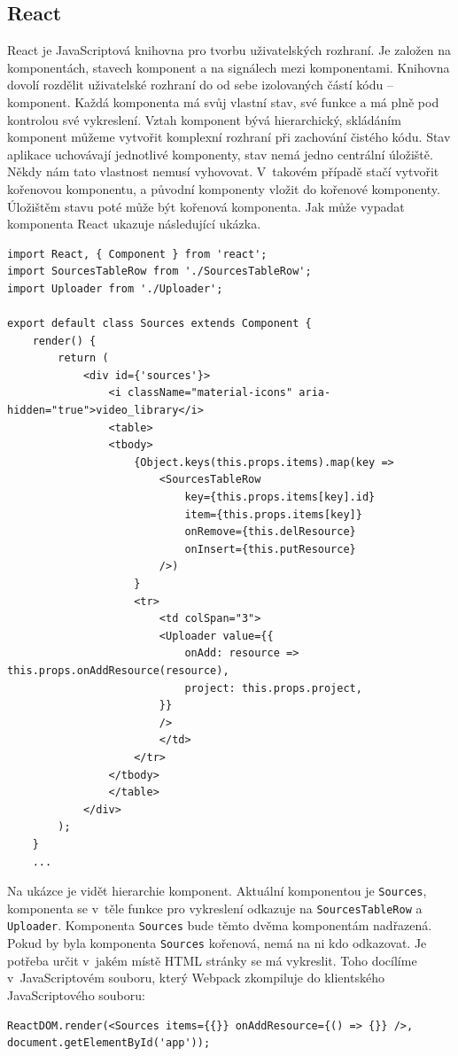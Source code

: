 \subsection{React}
React je JavaScriptová knihovna pro tvorbu uživatelských rozhraní. Je založen na komponentách, stavech komponent a na signálech mezi komponentami. Knihovna dovolí rozdělit uživatelské rozhraní do od sebe izolovaných částí kódu -- komponent. Každá komponenta má svůj vlastní stav, své funkce a má plně pod kontrolou své vykreslení. Vztah komponent bývá hierarchický, skládáním komponent můžeme vytvořit komplexní rozhraní při zachování čistého kódu. Stav aplikace uchovávají jednotlivé komponenty, stav nemá jedno centrální úložiště. Někdy nám tato vlastnost nemusí vyhovovat. V~takovém případě stačí vytvořit kořenovou komponentu, a původní komponenty vložit do kořenové komponenty. Úložištěm stavu poté může být kořenová komponenta. Jak může vypadat komponenta React ukazuje následující ukázka.
\begin{lstlisting}[style=JavaScript]
import React, { Component } from 'react';
import SourcesTableRow from './SourcesTableRow';
import Uploader from './Uploader';

export default class Sources extends Component {
    render() {
        return (
            <div id={'sources'}>
                <i className="material-icons" aria-hidden="true">video_library</i>
                <table>
                <tbody>
                    {Object.keys(this.props.items).map(key =>
                        <SourcesTableRow
                            key={this.props.items[key].id}
                            item={this.props.items[key]}
                            onRemove={this.delResource}
                            onInsert={this.putResource}
                        />)
                    }
                    <tr>
                        <td colSpan="3">
                        <Uploader value={{
                            onAdd: resource => this.props.onAddResource(resource),
                            project: this.props.project,
                        }}
                        />
                        </td>
                    </tr>
                </tbody>
                </table>
            </div>
        );
    }
    ...
\end{lstlisting}

Na ukázce je vidět hierarchie komponent. Aktuální komponentou je \texttt{Sources}, komponenta se v~těle funkce pro vykreslení odkazuje na \texttt{SourcesTableRow} a \texttt{Uploader}. Komponenta \texttt{Sources} bude těmto dvěma komponentám nadřazená. Pokud by byla komponenta \texttt{Sources} kořenová, nemá na ni kdo odkazovat. Je potřeba určit v~jakém místě HTML stránky se má vykreslit. Toho docílíme v~JavaScriptovém souboru, který Webpack zkompiluje do klientského JavaScriptového souboru:
\begin{lstlisting}[style=JavaScript]
ReactDOM.render(<Sources items={{}} onAddResource={() => {}} />, document.getElementById('app'));
\end{lstlisting}

